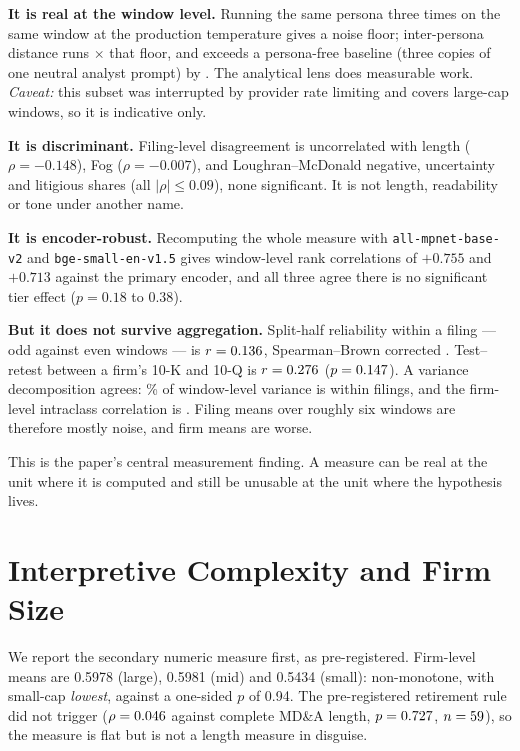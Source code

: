 \documentclass[sigconf,nonacm]{acmart}
\begin{document}
\textbf{It is real at the window level.} Running the same persona three times on
the same window at the production temperature gives a noise floor; inter-persona
distance runs \NoiseRatio$\times$ that floor, and exceeds a persona-free baseline
(three copies of one neutral analyst prompt) by \NoiseLensEffect. The analytical
lens does measurable work. \emph{Caveat:} this subset was interrupted by provider
rate limiting and covers \NoiseN{} large-cap windows, so it is indicative only.

\textbf{It is discriminant.} Filing-level disagreement is uncorrelated with length
($\rho = -0.148$), Fog ($\rho = -0.007$), and Loughran--McDonald negative, uncertainty
and litigious shares (all $|\rho| \le 0.09$), none significant. It is not length,
readability or tone under another name.

\textbf{It is encoder-robust.} Recomputing the whole measure with
\texttt{all-mpnet-base-v2} and \texttt{bge-small-en-v1.5} gives window-level rank
correlations of $+0.755$ and $+0.713$ against the primary encoder, and all three
agree there is no significant tier effect ($p = 0.18$ to $0.38$).

\textbf{But it does not survive aggregation.} Split-half reliability within a
filing --- odd against even windows --- is $r = 0.136$, Spearman--Brown
corrected \SplitHalfSB. Test--retest between a firm's 10-K and 10-Q is
$r = 0.276$ ($p = 0.147$). A variance decomposition agrees:
\VarWithinFilingPct\% of window-level variance is within filings, and the
firm-level intraclass correlation is \ICCFirm. Filing means over roughly six
windows are therefore mostly noise, and firm means are worse.

This is the paper's central measurement finding. A measure can be real at the
unit where it is computed and still be unusable at the unit where the hypothesis
lives.

\section{Interpretive Complexity and Firm Size}

We report the secondary numeric measure first, as pre-registered. Firm-level means
are 0.5978 (large), 0.5981 (mid) and 0.5434 (small): non-monotone, with small-cap
\emph{lowest}, against a one-sided $p$ of 0.94. The pre-registered retirement rule
did not trigger ($\rho = 0.046$ against complete MD\&A length,
$p = 0.727$, $n = 59$), so the measure is flat but is not a
length measure in disguise.
\end{document}
